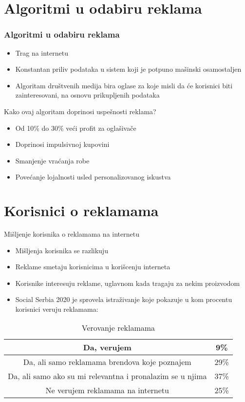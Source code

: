 \documentclass{beamer}
\begin{document}
	\section{Algoritmi u odabiru reklama}
	\begin{frame}
		\frametitle{Algoritmi u odabiru reklama}
		\begin{itemize}
			\item Trag na internetu
			\item Konstantan priliv podataka u sistem koji je potpuno mašinski osamostaljen
			\item Algoritam društvenih medija bira oglase za koje misli da će korisnici biti zainteresovani, na osnovu prikupljenih podataka
		\end{itemize} 
	\end{frame}
	
	\begin{frame}{Kako ovaj algoritam doprinosi uspešnosti reklama?}
		\begin{itemize}
			\item Od 10\% do 30\% veći profit za oglašivače
			\item Doprinosi impulsivnoj kupovini
			\item Smanjenje vraćanja robe
			\item Povećanje lojalnosti usled personalizovanog iskustva
		\end{itemize}
	\end{frame}
	
	\section{Korisnici o reklamama}
	\begin{frame}{Mišljenje korisnika o reklamama na internetu}
		\begin{itemize}
			\item Mišljenja korisnika se razlikuju
			\item Reklame smetaju korisnicima u korišcenju interneta
			\item Korisnike interesuju reklame, uglavnom kada tragaju za nekim proizvodom
			\item Social Serbia 2020 je sprovela istraživanje koje pokazuje u kom procentu korisnici veruju reklamama:
		\end{itemize}
		\begin{table}[h!]
			\begin{center}
				\caption{Verovanje reklamama}
				\begin{tabular}{|c|c|} \hline
					Da, verujem&9\%\\ \hline
					Da, ali samo reklamama brendova koje poznajem&29\%\\ \hline
					Da, ali samo ako su mi relevantna i pronalazim se u njima&37\%\\ \hline
					Ne verujem reklamama na internetu&25\%\\ \hline
				\end{tabular}
				\label{tab:tabela1}
			\end{center}
		\end{table}
	\end{frame}
	
\end{document}
